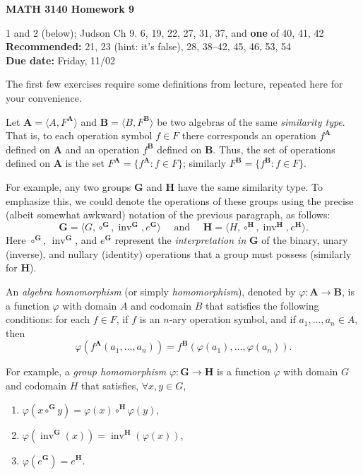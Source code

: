 \documentclass[12pt,reqno]{amsart}
\newcommand{\bA}{\ensuremath{\mathbf{A}}}
\newcommand{\bB}{\ensuremath{\mathbf{B}}}
\newcommand{\bG}{\ensuremath{\mathbf{G}}}
\newcommand{\bH}{\ensuremath{\mathbf{H}}}
\newcommand{\invG}{\ensuremath{\operatorname{inv}^{\bG}}}
\newcommand{\invH}{\ensuremath{\operatorname{inv}^{\bH}}}
\newcommand{\<}{\ensuremath{\langle}}
\renewcommand{\>}{\ensuremath{\rangle}}
\newcommand{\subject}{MATH\xspace}
\newcommand{\coursenumber}{3140\xspace}
\begin{document}
\thispagestyle{empty}

\noindent \textbf{\subject \coursenumber Homework 9}

\medskip

 1 and 2 (below); Judson Ch 9. 6, 19, 22, 27, 31, 37, and {\bf one} of 40, 41, 42\\
{\bf Recommended:} 21, 23 (hint: it's false), 28, 38--42, 45, 46, 53, 54\\
{\bf Due date:} Friday, 11/02

\bigskip

\noindent The first few exercises require some definitions from lecture, 
repeated here for your convenience.

\vskip5mm

\noindent Let $\bA = \<A, F^{\bA}\>$ and $\bB = \<B, F^{\bB}\>$ be two algebras of the
same \emph{similarity type}.  That is, to each operation
symbol $f \in F$ there corresponds an operation $f^{\bA}$ defined on $\bA$ and an
operation $f^{\bB}$ defined on $\bB$.
Thus, the set of operations defined on $\bA$ is the set 
$F^{\bA} = \{f^{\bA} : f\in F\}$; similarly 
$F^{\bB} = \{f^{\bB} : f\in F\}$.

\vskip3mm

\noindent For example, any two groups $\bG$ and $\bH$ have the same similarity type. 
To emphasize this, we could denote the operations of these groups using
the precise (albeit somewhat awkward) notation of the previous paragraph, as follows:
\[
\bG  = \<G, \circ^{\bG}, \invG, e^{\bG}\> \quad \text{ and } \quad
\bH  = \<H, \circ^{\bH}, \invH, e^{\bH}\>.
\] 
Here $\circ^{\bG}$, $\invG$, and $e^{\bG}$ represent the \emph{interpretation
in} $\bG$ of the binary, unary (inverse), and  nullary (identity)
operations that a group must possess (similarly for $\bH$).  

\vskip5mm

\noindent An \emph{algebra homomorphism} (or simply \emph{homomorphism}), denoted by
$\varphi: \bA \rightarrow \bB$, is a function $\varphi$ with domain $A$ and
codomain $B$ that satisfies the following conditions: for each $f \in F$, if $f$
is an $n$-ary operation symbol, and if $a_1, \dots, a_n \in A$, then
\[
\varphi(f^{\bA}(a_1, \dots, a_n)) = f^{\bB}(\varphi(a_1), \dots, \varphi(a_n)).
\]

\vskip3mm

\noindent For example, a \emph{group homomorphism} $\varphi: \bG \rightarrow \bH$  is a function 
$\varphi$ with domain $G$ and codomain $H$ that satisfies, $\forall x, y \in G$,
\begin{enumerate}
\item  $\varphi(x\circ^{\bG} y) = \varphi(x) \circ^{\bH} \varphi(y)$,
\item  $\varphi(\invG(x)) = \invH(\varphi(x))$,
\item  $\varphi(e^{\bG}) = e^{\bH}$.
\end{enumerate}
\end{document}
